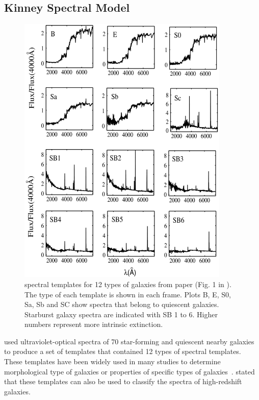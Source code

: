  \subsection{Kinney Spectral Model}
     \begin{figure}
        \centering
        \includegraphics[width=0.9\textwidth]{../image_paper2/k96.jpg}
        \caption[\citet{Kinney96} spectral templates for 12 types of galaxies]{\citet{Kinney96} spectral templates for 12 types of galaxies from \citet{Hossein12} paper (Fig. 1 in \citet{Hossein12}). The type of each template is shown in each frame. Plots B, E, S0, Sa, Sb and SC show spectra that belong to quiescent galaxies. Starburst galaxy spectra are indicated with SB 1 to 6. Higher numbers represent more intrinsic extinction.}
        \label{fig: k96}
    \end{figure}
      
     used ultraviolet-optical spectra of 70 star-forming and quiescent nearby galaxies to produce a set of templates that contained 12 types of spectral templates.
    These templates have been widely used in many studies to determine morphological type of galaxies or properties of specific types of galaxies~\citep[e.g.][]{Shakouri16, Paiano16, Laporte16, Holden16}.
     stated that these templates can also be used to classify the spectra of high-redshift galaxies. 
    
